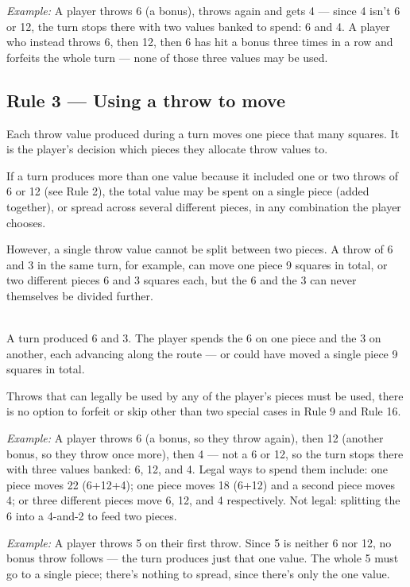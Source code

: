 \documentclass[10pt,a4paper]{article}
\newcommand{\ruletitle}[2]{\subsection*{Rule #1 --- #2}}
\begin{document}
\begin{center}
  
\end{center}

\emph{Example:} A player throws 6 (a bonus), throws again and gets 4 --- since
4 isn't 6 or 12, the turn stops there with two values banked to spend: 6 and
4. A player who instead throws 6, then 12, then 6 has hit a bonus three
times in a row and forfeits the whole turn --- none of those three values
may be used.

\ruletitle{3}{Using a throw to move}

Each throw value produced during a turn moves one piece that many squares. 
It is the player's decision which pieces they allocate throw values to.

If a turn produces more than one value because it included one or two 
throws of 6 or 12 (see Rule 2), the total value may be spent on a 
single piece (added together), or spread across several different pieces, 
in any combination the player chooses. 

However, a single throw value cannot be split between two pieces.
A throw of 6 and 3 in the same turn, for example, can move one piece 9
squares in total, or two different pieces 6 and 3 squares each,
but the 6 and the 3 can never themselves be divided further.

\begin{center}
  \\[1mm]
  {\small A turn produced 6 and 3. The player spends the 6 on one piece and the 3 on
  another, each advancing along the route --- or could have moved a single piece
  9 squares in total.}
\end{center}

Throws that can legally be used by any of the player's pieces must be used, there
is no option to forfeit or skip other than two special cases in Rule 9 and Rule 16.


\emph{Example:} A player throws 6 (a bonus, so they throw again), then 12
(another bonus, so they throw once more), then 4 --- not a 6 or 12, so the
turn stops there with three values banked: 6, 12, and 4. Legal ways to
spend them include: one piece moves 22 (6+12+4); one piece moves 18
(6+12) and a second piece moves 4; or three different pieces move 6, 12,
and 4 respectively. Not legal: splitting the 6 into a 4-and-2 to feed two
pieces.

\emph{Example:} A player throws 5 on their first throw. Since 5 is neither
6 nor 12, no bonus throw follows --- the turn produces just that one value.
The whole 5 must go to a single piece; there's nothing to spread, since
there's only the one value.
\end{document}
